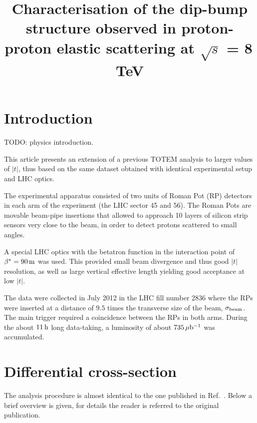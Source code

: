 \documentclass[doublecol]{epl/epl2}
\title{Characterisation of the dip-bump structure observed in proton-proton elastic scattering at $\sqrt s$ = 8\,TeV}
\def\un#1{\,{\rm #1}}
\begin{document}
\maketitle

\section{Introduction}
\label{s:introduction}

TODO: physics introduction.

This article presents an extension of a previous TOTEM analysis \cite{totem-8tev-90m} to larger values of $|t|$, thus based on the same dataset obtained with identical experimental setup and LHC optics.

The experimental apparatus consisted of two units of Roman Pot (RP) detectors in each arm of the experiment (the LHC sector 45 and 56). The Roman Pots are movable beam-pipe insertions that allowed to approach 10 layers of silicon strip sensors very close to the beam, in order to detect protons scattered to small angles.

A special LHC optics with the betatron function in the interaction point of $\beta^* = 90\un{m}$ was used. This provided small beam divergence and thus good $|t|$ resolution, as well as large vertical effective length yielding good acceptance at low $|t|$.

The data were collected in July 2012 in the LHC fill number 2836 where the RPs were inserted at a distance of $9.5$ times the transverse size of the beam, $\sigma_{\rm beam}$. The main trigger required a coincidence between the RPs in both arms. During the about $11\un{h}$ long data-taking, a luminosity of about $735\un{\mu b^{-1}}$ was accumulated.



\section{Differential cross-section}
\label{s:dsdt}

The analysis procedure is almost identical to the one published in Ref.~\cite{totem-8tev-90m}. Below a brief overview is given, for details the reader is referred to the original publication.
\end{document}
